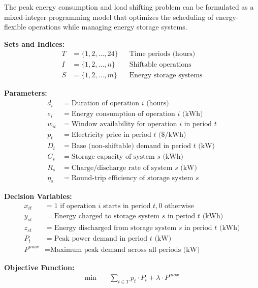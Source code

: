 \documentclass{article}
\begin{document}
The peak energy consumption and load shifting problem can be formulated as a mixed-integer programming model that optimizes the scheduling of energy-flexible operations while managing energy storage systems.

\textbf{Sets and Indices:}
\begin{align}
T &= \{1, 2, \ldots, 24\} && \text{Time periods (hours)} \\
I &= \{1, 2, \ldots, n\} && \text{Shiftable operations} \\
S &= \{1, 2, \ldots, m\} && \text{Energy storage systems}
\end{align}

\textbf{Parameters:}
\begin{align}
d_i &= \text{Duration of operation } i \text{ (hours)} \\
e_i &= \text{Energy consumption of operation } i \text{ (kWh)} \\
w_{it} &= \text{Window availability for operation } i \text{ in period } t \\
p_t &= \text{Electricity price in period } t \text{ (\$/kWh)} \\
D_t &= \text{Base (non-shiftable) demand in period } t \text{ (kW)} \\
C_s &= \text{Storage capacity of system } s \text{ (kWh)} \\
R_s &= \text{Charge/discharge rate of system } s \text{ (kW)} \\
\eta_s &= \text{Round-trip efficiency of storage system } s
\end{align}

\textbf{Decision Variables:}
\begin{align}
x_{it} &= 1 \text{ if operation } i \text{ starts in period } t, 0 \text{ otherwise} \\
y_{st} &= \text{Energy charged to storage system } s \text{ in period } t \text{ (kWh)} \\
z_{st} &= \text{Energy discharged from storage system } s \text{ in period } t \text{ (kWh)} \\
P_t &= \text{Peak power demand in period } t \text{ (kW)} \\
P^{max} &= \text{Maximum peak demand across all periods (kW)}
\end{align}

\textbf{Objective Function:}
\begin{align}
\min \quad & \sum_{t \in T} p_t \cdot P_t + \lambda \cdot P^{max}
\end{align}
\end{document}
